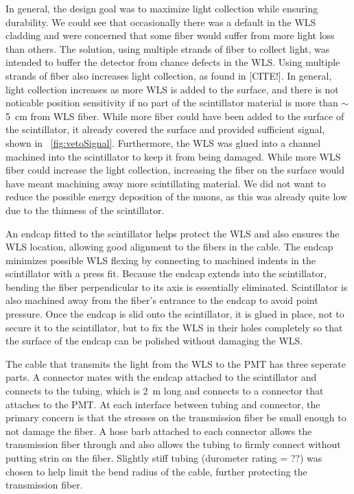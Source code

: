 In general, the design goal was to maximize light collection while ensuring durability.  We could see that occasionally there was a default in the WLS cladding and were concerned that some fiber would suffer from more light loss than others.  The solution, using multiple strands of fiber to collect light, was intended to buffer the detector from chance defects in the WLS.  Using multiple strands of fiber also increases light collection, as found in [CITE!].  In general, light collection increases as more WLS is added to the surface, and there is not noticable position sensitivity if no part of the scintillator material is more than $\sim$5~cm from WLS fiber.  While more fiber could have been added to the surface of the scintillator, it already covered the surface and provided sufficient signal, shown in {\fig}~\ref{fig:vetoSignal}.  Furthermore, the WLS was glued into a channel machined into the scintillator to keep it from being damaged.  While more WLS fiber could increase the light collection, increasing the fiber on the surface would have meant machining away more scintillating material.  We did not want to reduce the possible energy deposition of the muons, as this was already quite low due to the thinness of the scintillator.

An endcap fitted to the scintillator helps protect the WLS and also ensures the WLS location, allowing good alignment to the fibers in the cable.  The endcap minimizes possible WLS flexing by connecting to machined indents in the scintillator with a press fit.  Because the endcap extends into the scintillator, bending the fiber perpendicular to its axis is essentially eliminated.  Scintillator is also machined away from the fiber's entrance to the endcap to avoid point pressure.  Once the endcap is slid onto the scintillator, it is glued in place, not to secure it to the scintillator, but to fix the WLS in their holes completely so that the surface of the endcap can be polished without damaging the WLS.

The cable that transmits the light from the WLS to the PMT has three seperate parts.  A connector mates with the endcap attached to the scintillator and connects to the tubing, which is 2~m long and connects to a connector that attaches to the PMT.  At each interface between tubing and connector, the primary concern is that the stresses on the transmission fiber be small enough to not damage the fiber.  A hose barb attached to each connector allows the transmission fiber through and also allows the tubing to firmly connect without putting strin on the fiber.  Slightly stiff tubing (durometer rating = ??) was chosen to help limit the bend radius of the cable, further protecting the transmission fiber.  

